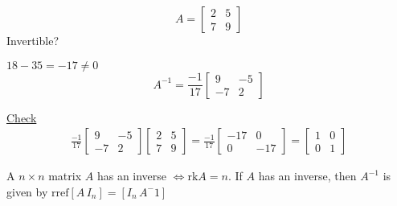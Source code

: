 \documentclass[../main.tex]{subfiles}
\begin{document}
\begin{example}[]
    \[ A = \begin{bmatrix}
        2 & 5 \\
        7 & 9
    \end{bmatrix} \]
    Invertible?

    \( 18 - 35 = -17 \neq 0 \) \checkmark
    \[ A^{-1} = \frac{-1}{17} \begin{bmatrix}
        9 & -5 \\
        -7 & 2
    \end{bmatrix} \]

    \underline{Check}
    \begin{gather*}
        \frac{-1}{17}
        \begin{bmatrix}
            9 & -5 \\
            -7 & 2
        \end{bmatrix}
        \begin{bmatrix}
            2 & 5 \\
            7 & 9
        \end{bmatrix}
        = \frac{-1}{17}
        \begin{bmatrix}
            -17 & 0 \\
            0 & -17
        \end{bmatrix}
        = \begin{bmatrix}
            1 & 0 \\
            0 & 1
        \end{bmatrix}
    \end{gather*}
\end{example}

\begin{theorem}[]
    A \( n \times n \) matrix \( A \) has an inverse \( \iff \text{rk}A = n \).
    If \( A \) has an inverse, then \( A^{-1} \) is given by \( \text{rref}\left[ A \, I_n \right] = \left[ I_n \, A^-1 \right] \)
\end{theorem}
\end{document}
